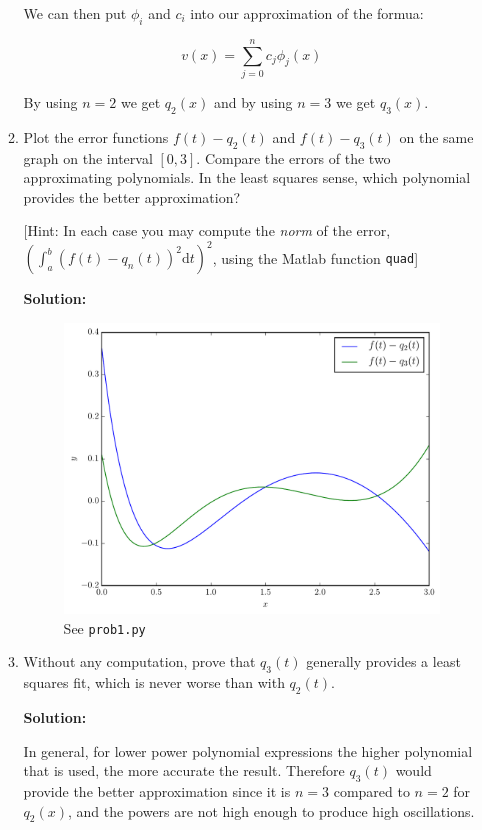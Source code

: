 \documentclass[12pt]{article}
\begin{document}
\begin{enumerate}
\begin{enumerate}
We can then put $\phi_{i}$ and $c_{i}$ into our approximation of the formua:

\[
v(x) = \sum_{j=0}^{n}c_{j}\phi_{j}(x)
\]

By using $n = 2$ we get $q_{2}(x)$ and by using $n = 3$ we get $q_{3}(x)$.

\item Plot the error functions $f(t) - q_{2}(t)$ and $f(t) - q_{3}(t)$ on the same graph on the interval $[0,3]$. Compare the errors of the two approximating polynomials. In the least squares sense, which polynomial provides the better approximation?

[Hint: In each case you may compute the {\em norm} of the error, $\left( \int_{a}^{b}(f(t) - q_{n}(t))^{2}\text{d}t \right)^{2}$, using the {\sc Matlab} function {\tt quad}]

{\bf Solution:}

\begin{figure}[H]
\centering
\includegraphics[width=.75\textwidth]{plot1.pdf}
\caption{See {\tt prob1.py}}
\end{figure}

\item Without any computation, prove that $q_{3}(t)$ generally provides a least squares fit, which is never worse than with $q_{2}(t)$. 

{\bf Solution:}

In general, for lower power polynomial expressions the higher polynomial that is used, the more accurate the result. Therefore $q_{3}(t)$ would provide the better approximation since it is $n = 3$ compared to $n = 2$ for $q_{2}(x)$, and the powers are not high enough to produce high oscillations. 
\end{enumerate}

\newpage


\end{enumerate}
\end{document}
